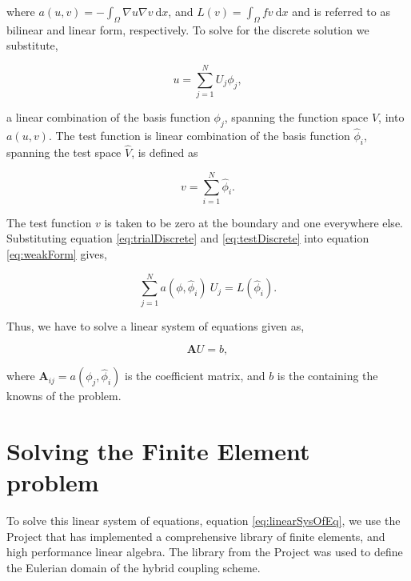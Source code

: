 where $a\left(u,v\right) = - \int_{\Omega} \nabla u \nabla v\ \mathrm{d}x$, and $L(v)=\int_{\Omega}fv\ \mathrm{d}x$ and is referred to as bilinear and linear form, respectively. To solve for the discrete solution we substitute,
	
	\begin{equation}
	u = \sum_{j=1}^{N} U_j \phi_j,
	\label{eq:trialDiscrete}
	\end{equation}

a linear combination of the basis function $\phi_j$, spanning the function space $V$, into $a\left(u,v\right)$. The test function is linear combination of the basis function $\hat{\phi}_i$, spanning the test space $\hat{V}$, is defined as

	\begin{equation}
	v=\sum_{i=1}^{N} \hat{\phi}_i.
	\label{eq:testDiscrete}
	\end{equation}
	
The test function $v$ is taken to be zero at the boundary and one everywhere else. Substituting equation \ref{eq:trialDiscrete} and \ref{eq:testDiscrete} into equation \ref{eq:weakForm} gives,
	
	\begin{equation}
	\sum_{j=1}^N a(\phi,\hat{\phi}_i)\ U_j = L(\hat{\phi}_i).
	\end{equation}

Thus, we have to solve a linear system of equations given as,

	\begin{equation}
	\mathbf{A}U = b,
	\label{eq:linearSysOfEq}
	\end{equation}	
	
where $\mathbf{A}_{ij} = a(\phi_j,\hat{\phi}_i)$ is the coefficient matrix, and $b$ is the  containing the knowns of the problem.
 	
\section{Solving the Finite Element problem}

To solve this linear system of equations, equation \ref{eq:linearSysOfEq}, we use the \fenics Project that has implemented a comprehensive library of finite elements, and high performance linear algebra. The \dolfin library from the \fenics Project was used to define the Eulerian domain of the hybrid coupling scheme.

